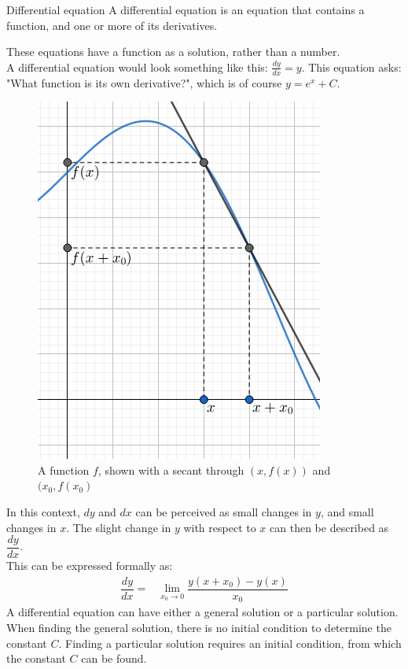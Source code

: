 \begin{definition}{Differential equation}{}
A differential equation is an equation that contains a function, and one or more of its derivatives.
\end{definition}
\noindent%
These equations have a function as a solution, rather than a number. 
\\
A differential equation would look something like this: $\frac{dy}{dx} = y$. This equation asks: "What function is its own derivative?", which is of course $y=e^x+C$.
\\
\setlength\intextsep{0pt}
\begin{figure}[H]
	\includegraphics[scale=0.5]{fig/img/dydx.png}
	\caption{A function $f$, shown with a secant through $(x, f(x))$ and $(x_0, f(x_0)$}\label{wrap-fig:1}
\end{figure}
In this context, $dy$ and $dx$ can be perceived as small changes in $y$, and small changes in $x$. The slight change in $y$ with respect to $x$ can then be described as $\dfrac{dy}{dx}$.
\\
This can be expressed formally as:
\\
\begin{align*}
	\dfrac{dy}{dx} =& \lim_{x_0\to 0} \dfrac{y(x+x_0)-y(x)}{x_0}
\end{align*}
A differential equation can  have either a general solution or a particular solution. When finding the general solution, there is no initial condition to determine the constant $C$. Finding a particular solution requires an initial condition, from which the constant $C$ can be found.

